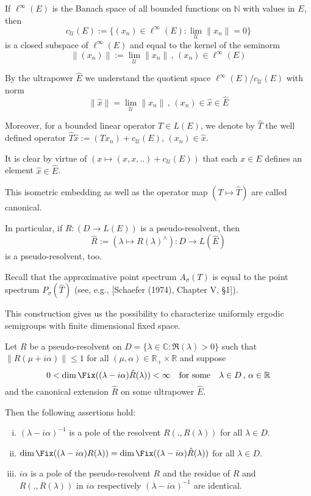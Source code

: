 If $\ell^{\infty}(E)$ is the Banach space of all bounded functions on $\mathbb{N}$ with values in $E$, then
\[
c_{\mathcal{U}}(E) := \{(x_{n}) \in \ell^{\infty}(E) : \lim_{\mathcal{U}}\|x_{n}\| = 0\}
\]
is a closed subspace of $\ell^{\infty}(E)$ and equal to the kernel of the seminorm
\[
\|(x_{n})\| := \lim_{\mathcal{U}}\|x_{n}\| \, , \, (x_{n}) \in \ell^{\infty}(E)
\]

By the ultrapower $\hat{E}$ we understand the quotient space $\ell^{\infty}(E)/c_{\mathcal{U}}(E)$ with norm
\[
\|\hat{x}\| = \lim_{\mathcal{U}}\|x_{n}\| \, , \, (x_{n}) \in \hat{x} \in \hat{E}
\]

Moreover, for a bounded linear operator $T \in L(E)$, we denote by $\hat{T}$ the well defined operator $\hat{T}\hat{x} := (Tx_{n}) + c_{\mathcal{U}}(E)$, $(x_{n}) \in \hat{x}$.

It is clear by virtue of $(x \mapsto (x, x, ..) + c_{\mathcal{U}}(E))$ that each $x \in E$ defines an element $\hat{x} \in \hat{E}$.

This isometric embedding as well as the operator map $(T \mapsto \hat{T})$ are called canonical.

In particular, if $R: (D \to L(E))$ is a pseudo-resolvent, then
\[
\hat{R} := (\lambda \mapsto R(\lambda)^{\wedge}): D \to L(\hat{E})
\]
is a pseudo-resolvent, too.

Recall that the approximative point spectrum $A_{\sigma}(T)$ is equal to the point spectrum $P_{\sigma}(\hat{T})$ (see, e.g., [Schaefer (1974), Chapter V, §1]).

This construction gives us the possibility to characterize uniformly ergodic semigroups with finite dimensional fixed space.

\begin{lemma}\label{lem:d3-2-2}
Let $R$ be a pseudo-resolvent on $D = \{\lambda \in \mathbb{C}: \Re(\lambda) > 0\}$ such that $\|R(\mu+i\alpha)\| \leq 1$ for all $(\mu,\alpha) \in \mathbb{R}_{+} \times \mathbb{R}$ and suppose
\[
0 < \dim \Fix((\lambda-i\alpha)\hat{R}(\lambda)) < \infty \quad \text{for some} \quad \lambda \in D \, , \, \alpha \in \mathbb{R}
\]
and the canonical extension $\hat{R}$ on some ultrapower $\hat{E}$.





Then the following assertions hold:

\begin{enumerate}[(i)]
\item $(\lambda - i\alpha)^{-1}$ is a pole of the resolvent $R(.,R(\lambda))$ for all $\lambda \in D$.

\item $\dim \Fix((\lambda-i\alpha)R(\lambda)) = \dim \Fix((\lambda-i\alpha)\hat{R}(\lambda))$ for all $\lambda \in D$.

\item $i\alpha$ is a pole of the pseudo-resolvent $R$ and the residue of $R$ and $R(.,R(\lambda))$ in $i\alpha$ respectively $(\lambda - i\alpha)^{-1}$ are identical.
\end{enumerate}
\end{lemma}

